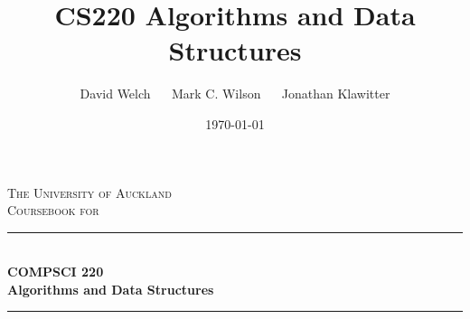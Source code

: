 \documentclass[11pt,oneside]{memoir}
\theoremstyle{definition}
\numberwithin{Lemma}{chapter}
\numberwithin{Exercise}{section}
\theoremstyle{remark}
\theoremstyle{boxampleStyle}
\begin{document}
   


\title{CS220 Algorithms and Data Structures}
\author{David Welch $\quad$ Mark C. Wilson $\quad$ Jonathan Klawitter}
\date{\today}

\begin{titlingpage}
\newcommand{\HRule}{\rule{\linewidth}{0.5mm}}
\setlength{\droptitle}{30pt} 
\begin{adjustwidth*}{1cm}{-2cm}
\centering

\vspace*{0.4cm}
\textsc{\LARGE The University of Auckland}\\[3cm]

\textsc{\Large Coursebook for}\\[0.4cm]

\HRule\\[0.5cm]
\Huge{\bfseries COMPSCI 220\\ 
Algorithms and Data Structures}\\[0.1cm]
\HRule\\[2.6cm]

\LARGE{\theauthor}

\end{adjustwidth*}
\end{titlingpage}



\setcounter{page}{1}





{}










%


%
%
%
% 
%


%
%
%
%
%



%

\printindex
\end{document}
